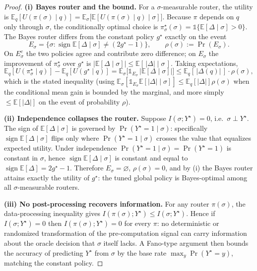 \begin{proof}
\textbf{(i) Bayes router and the bound.} For a $\sigma$-measurable router, the utility is $\mathbb{E}_q[U(\pi(\sigma)\mid q)]=\mathbb{E}_\sigma\big[\mathbb{E}[U(\pi(\sigma)\mid q)\mid\sigma]\big]$. Because $\pi$ depends on $q$ only through $\sigma$, the conditionally optimal choice is $\pi^\star_\sigma(\sigma)=\mathbb{1}\{\mathbb{E}[\Delta\mid\sigma]>0\}$. The Bayes router differs from the constant policy $g^\star$ exactly on the event
\[
E_\sigma=\big\{\sigma:\operatorname{sign}\mathbb{E}[\Delta\mid\sigma]\neq (2g^\star{-}1)\big\},\qquad \rho(\sigma):=\Pr(E_\sigma).
\]
On $E_\sigma^{c}$ the two policies agree and contribute zero difference; on $E_\sigma$ the improvement of $\pi^\star_\sigma$ over $g^\star$ is $|\mathbb{E}[\Delta\mid\sigma]|\le\mathbb{E}[\,|\Delta|\mid\sigma\,]$. Taking expectations,
\[
\mathbb{E}_q[U(\pi^\star_\sigma\mid q)]-\mathbb{E}_q[U(g^\star\mid q)]
=\mathbb{E}_\sigma\!\big[\mathbb{1}_{E_\sigma}\,|\mathbb{E}[\Delta\mid\sigma]|\big]
\le \mathbb{E}_q[\,|\Delta(q)|\,]\cdot\rho(\sigma),
\]
which is the stated inequality (using $\mathbb{E}_\sigma[\mathbb{1}_{E_\sigma}\mathbb{E}[|\Delta|\mid\sigma]]\le\mathbb{E}_q[|\Delta|]\rho(\sigma)$ when the conditional mean gain is bounded by the marginal, and more simply $\le\mathbb{E}[|\Delta|]$ on the event of probability $\rho$).

\textbf{(ii) Independence collapses the router.} Suppose $I(\sigma;Y^\star)=0$, i.e.\ $\sigma\perp Y^\star$. The sign of $\mathbb{E}[\Delta\mid\sigma]$ is governed by $\Pr(Y^\star{=}1\mid\sigma)$: specifically $\operatorname{sign}\mathbb{E}[\Delta\mid\sigma]$ flips only where $\Pr(Y^\star{=}1\mid\sigma)$ crosses the value that equalizes expected utility. Under independence $\Pr(Y^\star{=}1\mid\sigma)=\Pr(Y^\star{=}1)$ is constant in $\sigma$, hence $\operatorname{sign}\mathbb{E}[\Delta\mid\sigma]$ is constant and equal to $\operatorname{sign}\mathbb{E}[\Delta]=2g^\star{-}1$. Therefore $E_\sigma=\varnothing$, $\rho(\sigma)=0$, and by (i) the Bayes router attains exactly the utility of $g^\star$: the tuned global policy is Bayes-optimal among all $\sigma$-measurable routers.

\textbf{(iii) No post-processing recovers information.} For any router $\pi(\sigma)$, the data-processing inequality gives $I(\pi(\sigma);Y^\star)\le I(\sigma;Y^\star)$. Hence if $I(\sigma;Y^\star)=0$ then $I(\pi(\sigma);Y^\star)=0$ for every $\pi$: no deterministic or randomized transformation of the pre-computation signal can carry information about the oracle decision that $\sigma$ itself lacks. A Fano-type argument then bounds the accuracy of predicting $Y^\star$ from $\sigma$ by the base rate $\max_y\Pr(Y^\star{=}y)$, matching the constant policy.
\end{proof}

